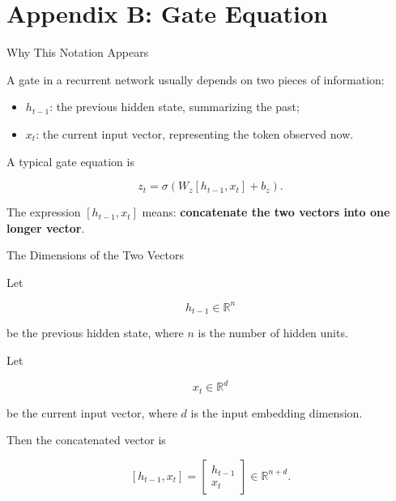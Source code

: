 \documentclass[aspectratio=169]{beamer}
\begin{document}
\section{Appendix B: Gate Equation}
%
\begin{frame}{Why This Notation Appears}

A gate in a recurrent network usually depends on two pieces of information:

\vspace{0.15cm}

\begin{itemize}
  \item $h_{t-1}$: the previous hidden state, summarizing the past;
  \item $x_t$: the current input vector, representing the token observed now.
\end{itemize}

\vspace{0.25cm}

A typical gate equation is

\[
  z_t = \sigma\left(W_z [h_{t-1}, x_t] + b_z\right).
\]

The expression $[h_{t-1}, x_t]$  means: \textbf{concatenate the two vectors into one longer vector}.

\end{frame}
%
%
\begin{frame}{The Dimensions of the Two Vectors}

Let

\[
  h_{t-1} \in \mathbb{R}^{n}
\]

be the previous hidden state, where $n$ is the number of hidden units.

\vspace{0.2cm}

Let

\[
  x_t \in \mathbb{R}^{d}
\]

be the current input vector, where $d$ is the input embedding dimension.

\vspace{0.25cm}

Then the concatenated vector is

\[
  [h_{t-1}, x_t]
  =
  \begin{bmatrix}
    h_{t-1} \\
    x_t
  \end{bmatrix}
  \in \mathbb{R}^{n+d}.
\]

\end{frame}
\end{document}
